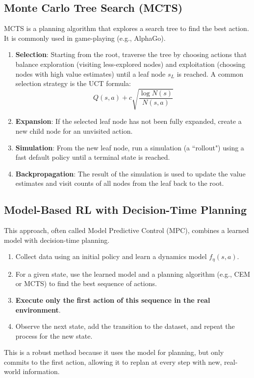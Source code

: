 \documentclass[12pt]{article}
\begin{document}
\subsection{Monte Carlo Tree Search (MCTS)}
MCTS is a planning algorithm that explores a search tree to find the best action. It is commonly used in game-playing (e.g., AlphaGo).
\begin{enumerate}
    \item \textbf{Selection}: Starting from the root, traverse the tree by choosing actions that balance exploration (visiting less-explored nodes) and exploitation (choosing nodes with high value estimates) until a leaf node $s_L$ is reached. A common selection strategy is the UCT formula:
    $$ Q(s, a) + c \sqrt{\frac{\log N(s)}{N(s, a)}} $$
    \item \textbf{Expansion}: If the selected leaf node has not been fully expanded, create a new child node for an unvisited action.
    \item \textbf{Simulation}: From the new leaf node, run a simulation (a ``rollout") using a fast default policy until a terminal state is reached.
    \item \textbf{Backpropagation}: The result of the simulation is used to update the value estimates and visit counts of all nodes from the leaf back to the root.
\end{enumerate}

\subsection{Model-Based RL with Decision-Time Planning}
This approach, often called Model Predictive Control (MPC), combines a learned model with decision-time planning.
\begin{enumerate}
    \item Collect data using an initial policy and learn a dynamics model $f_\eta(s,a)$.
    \item For a given state, use the learned model and a planning algorithm (e.g., CEM or MCTS) to find the best sequence of actions.
    \item \textbf{Execute only the first action of this sequence in the real environment}.
    \item Observe the next state, add the transition to the dataset, and repeat the process for the new state.
\end{enumerate}
This is a robust method because it uses the model for planning, but only commits to the first action, allowing it to replan at every step with new, real-world information.
\end{document}
